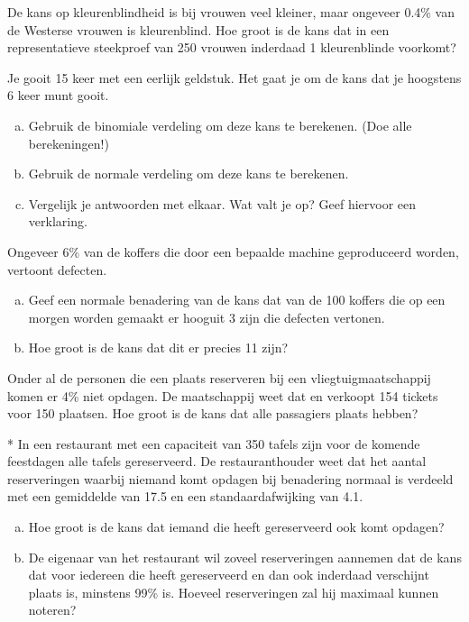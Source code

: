 \documentclass[a4paper,12pt, twoside]{article}
\begin{document}
\begin{oefening}
De kans op kleurenblindheid is bij vrouwen veel kleiner, maar ongeveer 0.4\% van de Westerse vrouwen is kleurenblind.
Hoe groot is de kans dat in een representatieve steekproef van 250 vrouwen inderdaad 1 kleurenblinde voorkomt?
\end{oefening}

\begin{oefening}
Je gooit 15 keer met een eerlijk geldstuk. Het gaat je om de kans dat je hoogstens 6 keer munt gooit.
\begin{enumerate}[(a)]
  \item Gebruik de binomiale verdeling om deze kans te berekenen. (Doe alle berekeningen!)
  \item Gebruik de normale verdeling om deze kans te berekenen.
  \item Vergelijk je antwoorden met elkaar. Wat valt je op? Geef hiervoor een verklaring.
\end{enumerate}
\end{oefening}

\begin{oefening}
Ongeveer 6\% van de koffers die door een bepaalde machine geproduceerd worden, vertoont defecten.
\begin{enumerate}[(a)]
  \item Geef een normale benadering van de kans dat van de 100 koffers die op een morgen worden gemaakt er hooguit 3 zijn die defecten vertonen.
  \item Hoe groot is de kans dat dit er precies 11 zijn?
\end{enumerate}
\end{oefening}

\begin{oefening}
Onder al de personen die een plaats reserveren bij een vliegtuigmaatschappij komen er 4\% niet opdagen. De maatschappij weet dat en verkoopt 154 tickets voor 150 plaatsen. Hoe groot is de kans dat alle passagiers plaats hebben?
\end{oefening}

\begin{oefening}*
In een restaurant met een capaciteit van 350 tafels zijn voor de komende feestdagen alle tafels gereserveerd. De restauranthouder weet dat het aantal reserveringen waarbij niemand komt opdagen bij benadering normaal is verdeeld met een gemiddelde van 17.5 en een standaardafwijking van 4.1.
\begin{enumerate}[(a)]
  \item Hoe groot is de kans dat iemand die heeft gereserveerd ook komt opdagen?
  \item De eigenaar van het restaurant wil zoveel reserveringen aannemen dat de kans dat voor iedereen die heeft gereserveerd en dan ook inderdaad verschijnt plaats is, minstens 99\% is. Hoeveel reserveringen zal hij maximaal kunnen noteren?
\end{enumerate}
\end{oefening}
\end{document}
